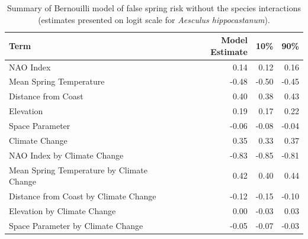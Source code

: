 \documentclass{article}\usepackage[]{graphicx}\usepackage[]{color}
\begin{document}
\begin{table}[H]
\centering
\caption{Summary of Bernouilli model of false spring risk without the species interactions (estimates presented on logit scale for \textit{Aesculus hippocastanum}).} 
\begin{tabular}{lrrr}
  \hline
Term & Model Estimate & 10\% & 90\% \\ 
  \hline
NAO Index & 0.14 & 0.12 & 0.16 \\ 
  Mean Spring 
Temperature & -0.48 & -0.50 & -0.45 \\ 
  Distance from 
Coast & 0.40 & 0.38 & 0.43 \\ 
  Elevation & 0.19 & 0.17 & 0.22 \\ 
  Space Parameter & -0.06 & -0.08 & -0.04 \\ 
  Climate Change & 0.35 & 0.33 & 0.37 \\ 
  NAO Index by Climate Change & -0.83 & -0.85 & -0.81 \\ 
  Mean Spring 
Temperature by Climate Change & 0.42 & 0.40 & 0.44 \\ 
  Distance from 
Coast by Climate Change & -0.12 & -0.15 & -0.10 \\ 
  Elevation by Climate Change & 0.00 & -0.03 & 0.03 \\ 
  Space Parameter by Climate Change & -0.05 & -0.07 & -0.03 \\ 
   \hline
\end{tabular}
\end{table}
\end{document}

